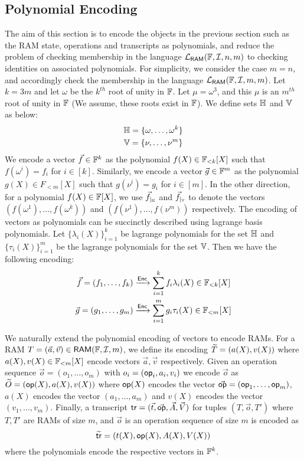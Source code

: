 \subsection{Polynomial Encoding}\label{subsec:poly-encoding}
The aim of this section is to encode the objects in the previous section such as the RAM state, operations and transcripts as polynomials,
and reduce the problem of checking membership in the language $\mathcal{L}_{\mathsf{RAM}}(\mathbb{F},\mathcal{I},n,m)$ to checking identities on associated polynomials. For
simplicity, we consider the case $m=n$, and accordingly check the membership in the language $\mathcal{L}_{\mathsf{RAM}}(\mathbb{F},\mathcal{I},m,m)$. Let $k=3m$ and let $\omega$ be
the $k^{th}$ root of unity in $\mathbb{F}$. Let $\mu=\omega^3$, and this $\mu$ is an $m^{th}$ root of unity in $\mathbb{F}$ (We assume, these roots exist in $\mathbb{F}$).
We define sets $\mathbb{H}$ and $\mathbb{V}$ as below:
\begin{gather}\label{eq:interpolation-sets}
    \mathbb{H} = \{\omega,\ldots,\omega^k\} \\
    \mathbb{V} = \{\nu,\ldots,\nu^m\}
\end{gather}
We encode a vector $\vec{f}\in \mathbb{F}^k$ as the polynomial $f(X)\in \mathbb{F}_{<k}[X]$ such that $f(\omega^i)=f_i$ for $i\in [k]$. Similarly, we encode a vector
$\vec{g}\in \mathbb{F}^m$ as the polynomial $g(X)\in F_{<m}[X]$ such that $g(\nu^i)=g_i$ for $i\in [m]$. In the other direction, for a polynomial $f(X)\in \mathbb{F}[X]$,
we use $\vec{f}_{|_{\mathbb{H}}}$ and $\vec{f}_{|_{\mathbb{V}}}$ to denote the vectors $(f(\omega^1),\ldots,f(\omega^k))$ and $(f(\nu^1),\ldots,f(\nu^m))$ respectively.
The encoding of vectors as polynomials can be succinctly described using lagrange basis polynomials. Let $\{\lambda_i(X)\}_{i=1}^k$ be lagrange polynomials
for the set $\mathbb{H}$ and $\{\tau_i(X)\}_{i=1}^m$ be the lagrange polynomials for the set $\mathbb{V}$. Then we have the following encoding:
\begin{align*}
    \vec{f}=(f_1,\ldots,f_k) &\xrightarrow{\mathsf{Enc}} \sum_{i=1}^k f_i\lambda_i(X) \in \mathbb{F}_{<k}[X] \\
    \vec{g}=(g_1,\ldots,g_m) &\xrightarrow{\mathsf{Enc}} \sum_{i=1}^m g_i\tau_i(X) \in \mathbb{F}_{<m}[X]
\end{align*}

We naturally extend the polynomial encoding of vectors to encode RAMs. For a RAM $T=(\vec{a},\vec{v})\in \mathsf{RAM}(\mathbb{F}, \mathcal{I}, {m})$, we define its encoding
$\widetilde{T}=(a(X),v(X))$ where $a(X),v(X)\in \mathbb{F}_{<m}[X]$ encode vectors $\vec{a}, \vec{v}$ respectively. Given an operation sequence
$\vec{o}=(o_1,\ldots,o_m)$ with $o_i=(\mathsf{op}_i,a_i,v_i)$ we encode $\vec{o}$ as $\widetilde{O}=(\mathsf{op}(X),a(X),v(X))$ where $\mathsf{op}(X)$ encodes the
vector $\vec{\mathsf{op}}=(\mathsf{op}_1,\ldots,\mathsf{op}_m)$, $a(X)$ encodes the vector $(a_1,\ldots,a_m)$ and $v(X)$ encodes the vector $(v_1,\ldots,v_m)$.
Finally, a transcript $\mathsf{tr}=(\vec{t},\vec{\mathsf{op}},\vec{A},\vec{V})$ for tuples $(T,\vec{o},T')$ where $T,T'$ are RAMs of size $m$, and $\vec{o}$ is an
operation sequence of size $m$ is encoded as $$\widetilde{\mathsf{tr}}=(t(X),\mathsf{op}(X),A(X),V(X))$$ where the polynomials encode the respective vectors in $\mathbb{F}^k$.


